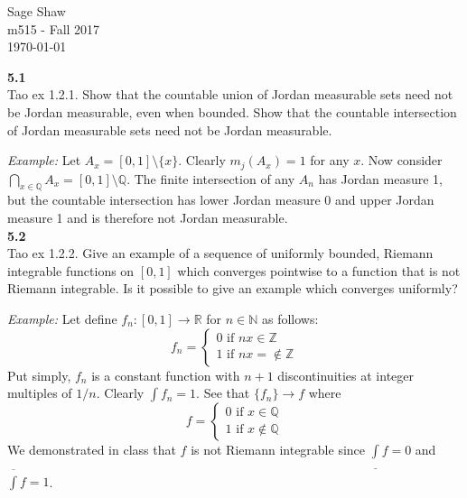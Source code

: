 \documentclass[12pt]{article}
\newcommand{\problem}[1]{\hspace{-4 ex} \large \textbf{#1}\\}
\begin{document}
	\thispagestyle{empty}
	
	\begin{flushright}
		Sage Shaw \\
		m515 - Fall 2017 \\
		\today
	\end{flushright}
	

\problem{5.1} Tao ex 1.2.1. Show that the countable union of Jordan measurable sets need not be Jordan measurable, even when bounded. Show that the countable intersection of Jordan measurable sets need not be Jordan measurable.

	\textit{Example:} Let $A_x = [0,1]\setminus\{x\}$. Clearly $m_j(A_x)=1$ for any $x$. Now consider $\bigcap\limits_{x \in \mathbb{Q}}A_x = [0,1] \setminus \mathbb{Q}$. The finite intersection of any $A_n$ has Jordan measure 1, but the countable intersection has lower Jordan measure 0 and upper Jordan measure 1 and is therefore not Jordan measurable.\\
	
	




\problem{5.2} Tao ex 1.2.2. Give an example of a sequence of uniformly bounded, Riemann integrable functions on $[0,1]$ which converges pointwise to a function that is not Riemann integrable. Is it possible to give an example which converges uniformly?

	\textit{Example:} Let define $f_n:[0,1] \to \mathbb{R}$ for $n \in \mathbb{N}$ as follows: 
	\[
		f_n = 
			\begin{cases}
				0 \text{ if } nx \in \mathbb{Z} \\
				1 \text{ if } nx = \notin \mathbb{Z}
			\end{cases}
	\]
	Put simply, $f_n$ is a constant function with $n+1$ discontinuities at integer multiples of $1/n$. Clearly $\int f_n = 1$. See that $\{f_n\} \to f$ where
	\[
		f = 
			\begin{cases}
				0 \text{ if } x \in \mathbb{Q} \\
				1 \text{ if } x \notin \mathbb{Q}
			\end{cases}
	\]
	We demonstrated in class that $f$ is not Riemann integrable since $\underline{\int} f = 0$ and $\overline {\int} f = 1$.
	
\end{document}
